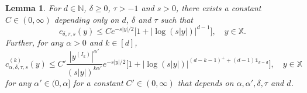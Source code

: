 \documentclass[11pt,reqno]{amsart}
\numberwithin{equation}{section}
\newtheorem{lemma}[theorem]{Lemma}
\theoremstyle{definition}
\newcommand{\N}{\mathbb{N}}
\newcommand{\XX}{\mathbb{X}}
\begin{document}
\begin{lemma}
	\label{lemma:c-bound}
	For $d \in \N$, $\delta \ge 0$, $\tau>-1$ and $s>0$, there exists a constant $C \in (0,\infty)$ depending only on $d$, $\delta$ and $\tau$ such that
	\begin{displaymath}
		c_{\delta,\tau,s}(y)\leq C
		e^{-s|y|/2}\Big[1+\big|\log(s|y|)\big|^{d-1}\Big], \quad y \in \XX.
	\end{displaymath}
	Further, for any $\alpha>0$ and $k \in [d]$,
	\begin{equation*}
		c_{\alpha,\delta,\tau,s}^{(k)}(y)\leq C'
		\frac{|y^{(I_k)}|^{\alpha'}}{(s|y|)^{k\alpha'}} e^{-s|y|/2}\Big[1+\big|\log(s|y|)\big|^{(d-k-1)^+ + (d-1)\mathds{1}_{k=d}}\Big], \quad y \in \XX
	\end{equation*}
for any $\alpha' \in (0,\alpha]$ for a constant $C' \in (0,\infty)$ that depends on $\alpha, \alpha',\delta, \tau$ and $d$.
\end{lemma}
\end{document}

